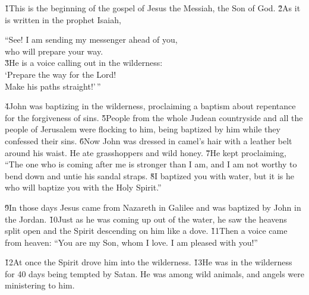 


\v{1}This is the beginning of the gospel of Jesus the Messiah, the Son of God. \v{2}As it is written in the prophet Isaiah,

\begin{poetry}
\poeml ``See! I am sending my messenger ahead of you, \\
\poemll    who will prepare your way. \\
\poeml \v{3}He is a voice calling out in the wilderness: \\
\poemll    `Prepare the way for the Lord! \\
\poemlll       Make his paths straight!'\,''
\end{poetry}

\v{4}John was baptizing in the wilderness, proclaiming a baptism about repentance for the forgiveness of sins. \v{5}People from the whole Judean countryside and all the people of Jerusalem were flocking to him, being baptized by him while they confessed their sins. \v{6}Now John was dressed in camel's hair with a leather belt around his waist. He ate grasshoppers and wild honey. \v{7}He kept proclaiming, ``The one who is coming after me is stronger than I am, and I am not worthy to bend down and untie his sandal straps. \v{8}I baptized you with water, but it is he who will baptize you with the Holy Spirit.''

\v{9}In those days Jesus came from Nazareth in Galilee and was baptized by John in the Jordan. \v{10}Just as he was coming up out of the water, he saw the heavens split open and the Spirit descending on him like a dove. \v{11}Then a voice came from heaven: ``You are my Son, whom I love. I am pleased with you!''

\v{12}At once the Spirit drove him into the wilderness. \v{13}He was in the wilderness for 40 days being tempted by Satan. He was among wild animals, and angels were ministering to him.

